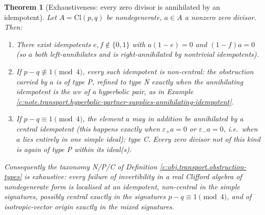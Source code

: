\documentclass[11pt]{article}
\newtheorem{theorem}{Theorem}[section]
\theoremstyle{definition}
\theoremstyle{plain}
\providecommand{\Cl}{}\renewcommand{\Cl}{\mathrm{Cl}}
\begin{document}
\begin{theorem}[Exhaustiveness: every zero divisor is annihilated by an idempotent]\label{c:transport.exhaustiveness-every-zero-divisor-annihilated-idempotent}
Let $A = \Cl(p,q)$ be nondegenerate, $a \in A$ a nonzero zero divisor. Then:
\begin{enumerate}
\item There exist idempotents $e, f \notin \{0, 1\}$ with $a(1-e) = 0$ and $(1-f)a = 0$ (so $a$ both left-annihilates and is right-annihilated by nontrivial idempotents).
\item If $p - q \not\equiv 1 \pmod 4$, every such idempotent is non-central: the obstruction carried by $a$ is of type P, refined to type N exactly when the annihilating idempotent is the $wv$ of a hyperbolic pair, as in Example \ref{c:note.transport.hyperbolic-partner-supplies-annihilating-idempotent}.
\item If $p - q \equiv 1 \pmod 4$, the element $a$ may in addition be annihilated by a \emph{central} idempotent (this happens exactly when $\varepsilon_+ a = 0$ or $\varepsilon_- a = 0$, i.e.\ when $a$ lies entirely in one simple ideal): type C. Every zero divisor not of this kind is again of type P within its ideal(s).
\end{enumerate}
Consequently the taxonomy N/P/C of Definition \ref{c:obj.transport.obstruction-types} is exhaustive: every failure of invertibility in a real Clifford algebra of nondegenerate form is localised at an idempotent, non-central in the simple signatures, possibly central exactly in the signatures $p - q \equiv 1 \pmod 4$, and of isotropic-vector origin exactly in the mixed signatures.
\end{theorem}
\end{document}
